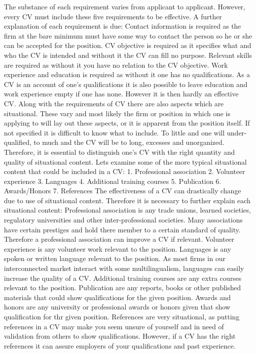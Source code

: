 The substance of each requirement varies from applicant to applicant. However, every CV must include these five requirements to be effective.
A further explanation of each requirement is due:
Contact information is required as the firm at the bare minimum must have some way to contact the person so he or she can be accepted for the position.
CV objective is required as it specifies what and who the CV is intended and without it the CV can fill no purpose.
Relevant skills are required as without it you have no relation to the CV objective.
Work experience and education is required as without it one has no qualifications.
As a CV is an account of one’s qualifications it is also possible to leave education and work experience empty if one has none.
However it is then hardly an effective CV.\cite{Difference_between_resume_and_curriculum_Vitae}
Along with the requirements of CV there are also aspects which are situational.
These vary and most likely the firm or position in which one is applying to will lay out these aspects, or it is apparent from the position itself.
If not specified it is difficult to know what to include. To little and one will under-qualified, to much and the CV will be to long\cite{Job_Application_for_science}, excesses and unorganized.
Therefore, it is essential to distinguish one’s CV with the right quantity and quality of situational content.
Lets examine some of the more typical situational content that could be included in a CV:
1. Professional association
2. Volunteer experience
3. Languages
4. Additional training courses
5. Publication
6. Awards/Honors
7. References
\cite{6_sections}
The effectiveness of a CV can drastically change due to use of situational content.
Therefore it is necessary to further explain each situational content:
Professional association is any trade unions, learned societies, regulatory universities and other inter-professional societies.
Many associations have certain prestiges and hold there member to a certain standard of quality.
Therefore a professional association can improve a CV if relevant.\cite{Professional_associations_and_organizations}\cite{Perks_of_professional_organizations}
Volunteer experience is any volunteer work relevant to the position.
Languages is any spoken or written language relevant to the position.
As most firms in our interconnected market interact with some multilingualism, languages can easily increase the quality of a CV.
Additional training courses are any extra courses relevant to the position.
Publication are any reports, books or other published materials that could show qualifications for the given position.
Awards and honors are any university or professional awards or honors given that show qualification for thr given position.
References are very situational, as putting references in a CV may make you seem unsure of yourself and in need of validation from others to show qualifications.
However, if a CV has the right references it can assure employers of your qualifications and past experience.

